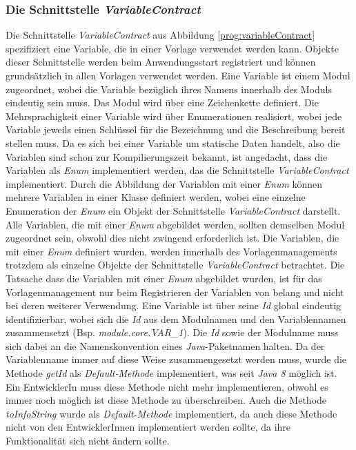 \subsubsection{Die Schnittstelle \emph{VariableContract}}
\label{sec:variableContract}
Die Schnittstelle \emph{VariableContract} aus Abbildung \ref{prog:variableContract} spezifiziert eine Variable, die in einer Vorlage verwendet werden kann. Objekte dieser Schnittstelle werden beim Anwendungsstart registriert und können grundsätzlich in allen Vorlagen verwendet werden. Eine Variable ist einem Modul zugeordnet, wobei die Variable bezüglich ihres Namens innerhalb des Moduls eindeutig sein muss. Das Modul wird über eine Zeichenkette definiert. Die Mehrsprachigkeit einer Variable wird über Enumerationen realisiert, wobei jede Variable jeweils einen Schlüssel für die Bezeichnung und die Beschreibung bereit stellen muss.
\newline
\newline
Da es sich bei einer Variable um statische Daten handelt, also die Variablen sind schon zur Kompilierungszeit bekannt, ist angedacht, dass die Variablen als \emph{Enum} implementiert werden, das die Schnittstelle \emph{VariableContract} implementiert. Durch die Abbildung der Variablen mit einer \emph{Enum} können mehrere Variablen in einer Klasse definiert werden, wobei eine einzelne Enumeration der \emph{Enum} ein Objekt der Schnittstelle \emph{VariableContract} darstellt. Alle Variablen, die mit einer \emph{Enum} abgebildet werden, sollten demselben Modul zugeordnet sein, obwohl dies nicht zwingend erforderlich ist. Die Variablen, die mit einer \emph{Enum} definiert wurden, werden innerhalb des Vorlagenmanagements trotzdem als einzelne Objekte der Schnittstelle \emph{VariableContract} betrachtet. Die Tatsache dass die Variablen mit einer \emph{Enum} abgebildet wurden, ist für das Vorlagenmanagement nur beim Registrieren der Variablen von belang und nicht bei deren weiterer Verwendung.
\newline
\newline
Eine Variable ist über seine \emph{Id} global eindeutig identifizierbar, wobei sich die \emph{Id} aus dem Modulnamen und den Variablennamen zusammensetzt (Bsp. \emph{module.core.VAR\_1}). Die \emph{Id} sowie der Modulname muss sich dabei an die Namenskonvention eines \emph{Java}-Paketnamen halten. Da der Variablenname immer auf diese Weise zusammengesetzt werden muss, wurde die Methode \emph{getId} als \emph{Default-Methode} implementiert, was seit \emph{Java 8} möglich ist. Ein EntwicklerIn muss diese Methode nicht mehr implementieren, obwohl es immer noch möglich ist diese Methode zu überschreiben. Auch die Methode \emph{toInfoString} wurde als \emph{Default-Methode} implementiert, da auch diese Methode nicht von den EntwicklerInnen implementiert werden sollte, da ihre Funktionalität sich nicht ändern sollte.
\newpage


